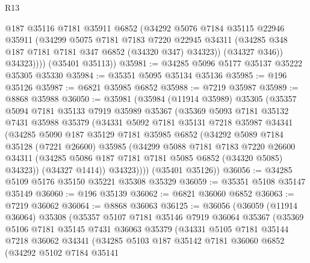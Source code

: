 \begin{lexlean}{R13}
\begin{coremodule}
              @187
              @35116
              @7181
              @35911
              @6852
              (@34292
                @5076
                @7184
                @35115
                @22946
                @35911
                (@34299
                  @5075
                  @7181
                  @7183
                  @7220
                  @22945
                  @34311
                  (@34285 @348 @187 @7181 @7181 @347 @6852 (@34320 @347) @34323))
                (@34327 @346))
              @34323))))
      (@35401 @35113))
@35981 := @34285 @5096 @5177 @35137 @35222 @35305 @35330
@35984 := @35351 @5095 @35134 @35136
@35985 := @196 @35126
@35987 := @6821 @35985 @6852
@35988 := @7219 @35987
@35989 := @8868 @35988
@36050 := @35981
    (@35984
      (@11914 @35989)
      @35305
      (@35357
        @5094
        @7181
        @35133
        @7919
        @35989
        @35367
        (@35369
          @5093
          @7181
          @35132
          @7431
          @35988
          @35379
          (@34331
            @5092
            @7181
            @35131
            @7218
            @35987
            @34341
            (@34285
              @5090
              @187
              @35129
              @7181
              @35985
              @6852
              (@34292
                @5089
                @7184
                @35128
                (@7221 @26600)
                @35985
                (@34299
                  @5088
                  @7181
                  @7183
                  @7220
                  @26600
                  @34311
                  (@34285 @5086 @187 @7181 @7181 @5085 @6852 (@34320 @5085) @34323))
                (@34327 @1414))
              @34323))))
      (@35401 @35126))
@36056 := @34285 @5109 @5176 @35150 @35221 @35308 @35329
@36059 := @35351 @5108 @35147 @35149
@36060 := @196 @35139
@36062 := @6821 @36060 @6852
@36063 := @7219 @36062
@36064 := @8868 @36063
@36125 := @36056
    (@36059
      (@11914 @36064)
      @35308
      (@35357
        @5107
        @7181
        @35146
        @7919
        @36064
        @35367
        (@35369
          @5106
          @7181
          @35145
          @7431
          @36063
          @35379
          (@34331
            @5105
            @7181
            @35144
            @7218
            @36062
            @34341
            (@34285
              @5103
              @187
              @35142
              @7181
              @36060
              @6852
              (@34292
                @5102
                @7184
                @35141

\end{coremodule}
\end{lexlean}
